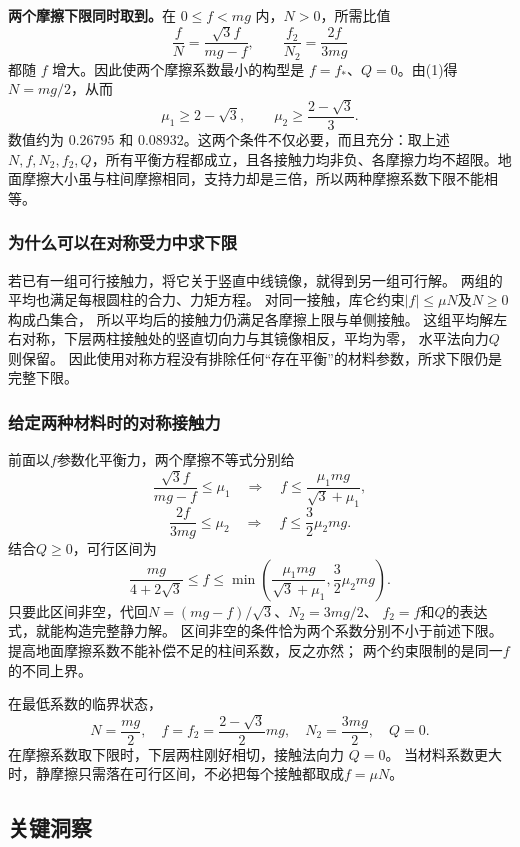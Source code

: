\documentclass[UTF8,fontset=fandol,a4paper,11pt]{ctexart}
\begin{document}
\textbf{两个摩擦下限同时取到。}在 $0\le f<mg$ 内，$N>0$，所需比值
\[
 \frac fN=\frac{\sqrt3 f}{mg-f},\qquad
 \frac{f_2}{N_2}=\frac{2f}{3mg}
\]
都随 $f$ 增大。因此使两个摩擦系数最小的构型是 $f=f_*$、$Q=0$。由(1)得 $N=mg/2$，从而
\[
 \boxed{\mu_1\ge2-\sqrt3},\qquad
 \boxed{\mu_2\ge\frac{2-\sqrt3}{3}}.
\]
数值约为 $0.26795$ 和 $0.08932$。这两个条件不仅必要，而且充分：取上述 $N,f,N_2,f_2,Q$，所有平衡方程都成立，且各接触力均非负、各摩擦力均不超限。地面摩擦大小虽与柱间摩擦相同，支持力却是三倍，所以两种摩擦系数下限不能相等。
\subsubsection*{为什么可以在对称受力中求下限}
若已有一组可行接触力，将它关于竖直中线镜像，就得到另一组可行解。
两组的平均也满足每根圆柱的合力、力矩方程。
对同一接触，库仑约束$|f|\leq\mu N$及$N\geq0$构成凸集合，
所以平均后的接触力仍满足各摩擦上限与单侧接触。
这组平均解左右对称，下层两柱接触处的竖直切向力与其镜像相反，平均为零，
水平法向力$Q$则保留。
因此使用对称方程没有排除任何“存在平衡”的材料参数，所求下限仍是完整下限。

\subsubsection*{给定两种材料时的对称接触力}
前面以$f$参数化平衡力，两个摩擦不等式分别给
\[
\frac{\sqrt3 f}{mg-f}\leq\mu_1
\quad\Longrightarrow\quad
f\leq\frac{\mu_1mg}{\sqrt3+\mu_1},
\]
\[
\frac{2f}{3mg}\leq\mu_2
\quad\Longrightarrow\quad
f\leq\frac32\mu_2mg.
\]
结合$Q\geq0$，可行区间为
\[
\boxed{\frac{mg}{4+2\sqrt3}\leq f\leq
\min\left(\frac{\mu_1mg}{\sqrt3+\mu_1},\frac32\mu_2mg\right)}.
\]
只要此区间非空，代回$N=(mg-f)/\sqrt3$、$N_2=3mg/2$、
$f_2=f$和$Q$的表达式，就能构造完整静力解。
区间非空的条件恰为两个系数分别不小于前述下限。
提高地面摩擦系数不能补偿不足的柱间系数，反之亦然；
两个约束限制的是同一$f$的不同上界。

在最低系数的临界状态，
\[
N=\frac{mg}{2},\quad f=f_2=\frac{2-\sqrt3}{2}mg,\quad
N_2=\frac{3mg}{2},\quad Q=0.
\]
在摩擦系数取下限时，下层两柱刚好相切，接触法向力 $Q=0$。
当材料系数更大时，静摩擦只需落在可行区间，不必把每个接触都取成$f=\mu N$。




\subsection*{关键洞察}
\end{document}
